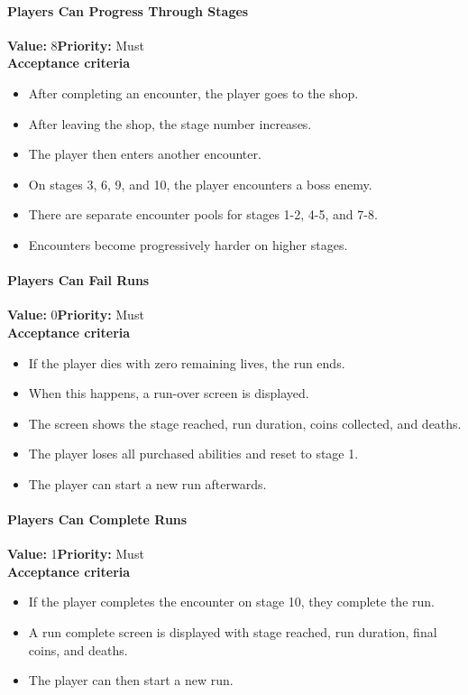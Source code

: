 \paragraph{Players Can Progress Through Stages}
\textbf{Value:} 8\quad \textbf{Priority:} Must\\
\textbf{Acceptance criteria}
\begin{itemize}
  \item After completing an encounter, the player goes to the shop.
  \item After leaving the shop, the stage number increases.
  \item The player then enters another encounter.
  \item On stages 3, 6, 9, and 10, the player encounters a boss enemy.
  \item There are separate encounter pools for stages 1-2, 4-5, and 7-8.
  \item Encounters become progressively harder on higher stages.
\end{itemize}

\paragraph{Players Can Fail Runs}
\textbf{Value:} 0\quad \textbf{Priority:} Must\\
\textbf{Acceptance criteria}
\begin{itemize}
  \item If the player dies with zero remaining lives, the run ends.
  \item When this happens, a run-over screen is displayed.
  \item The screen shows the stage reached, run duration, coins collected, and deaths.
  \item The player loses all purchased abilities and reset to stage 1.
  \item The player can start a new run afterwards.
\end{itemize}

\paragraph{Players Can Complete Runs}
\textbf{Value:} 1\quad \textbf{Priority:} Must\\
\textbf{Acceptance criteria}
\begin{itemize}
  \item If the player completes the encounter on stage 10, they complete the run.
  \item A run complete screen is displayed with stage reached, run duration, final coins, and deaths.
  \item The player can then start a new run.
\end{itemize}

